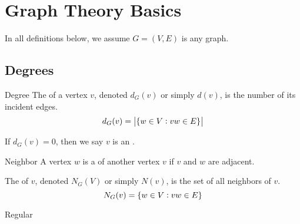 \documentclass{styles/tufte}
\author{Jiaming (George) Yu}
\date{\today}
\begin{document}
\maketitle
\tableofcontents
\newpage



\section{Graph Theory Basics}

In all definitions below, we assume $G = (V, E)$ is any graph.

\subsection{Degrees}

\begin{definition}{Degree}{}
  The  of a vertex $v$, denoted $d_G(v)$ or simply $d(v)$, is the number of its incident edges.
  \[ d_G(v) = \card{\set{w \in V: vw \in E}} \]
  
  If $d_G(v) = 0$, then we say $v$ is an .
\end{definition}

\begin{definition}{Neighbor}{}
  A vertex $w$ is a  of another vertex $v$ if $v$ and $w$ are adjacent.
  
  The  of $v$, denoted $N_G(V)$ or simply $N(v)$, is the set of all neighbors of $v$.
  \[ N_G(v) = \set{w \in V: vw \in E} \]
\end{definition}

\begin{definition}{Regular}{}
  
\end{definition}
\end{document}
